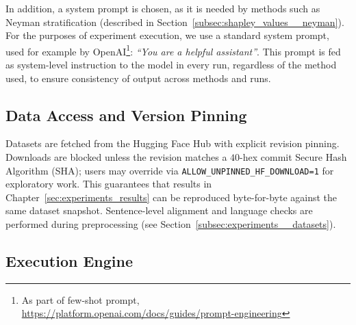In addition, a system prompt is chosen, as it is needed by methods such as Neyman stratification (described in Section~\ref{subsec:shapley_values__neyman}). For the purposes of experiment execution, we use a standard system prompt, used for example by OpenAI\footnote{As part of few-shot prompt, \url{https://platform.openai.com/docs/guides/prompt-engineering}}: \textit{``You are a helpful assistant''}. This prompt is fed as system-level instruction to the model in every run, regardless of the method used, to ensure consistency of output across methods and runs.


\subsection{Data Access and Version Pinning}
\label{subsec:infra__data}


Datasets are fetched from the Hugging Face Hub with explicit revision pinning. Downloads are blocked unless the revision matches a $40$-hex commit Secure Hash Algorithm (SHA); users may override via \texttt{ALLOW\_UNPINNED\_HF\_DOWNLOAD=1} for exploratory work. This guarantees that results in Chapter~\ref{sec:experiments_results} can be reproduced byte-for-byte against the same dataset snapshot. Sentence-level alignment and language checks are performed during preprocessing (see Section~\ref{subsec:experiments__datasets}).


\subsection{Execution Engine}
\label{subsec:infra__engine}


